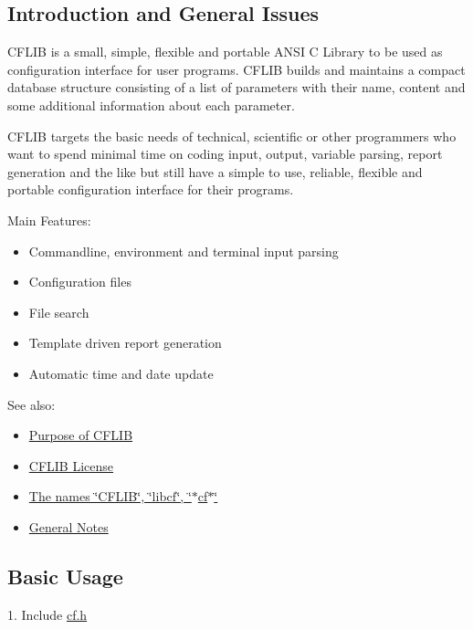\hypertarget{index_intro}{}\subsection{Introduction and General Issues}\label{index_intro}
CFLIB is a small, simple, flexible and portable ANSI C Library to be used as configuration interface for user programs. CFLIB builds and maintains a compact database structure consisting of a list of parameters with their name, content and some additional information about each parameter.

CFLIB targets the basic needs of technical, scientific or other programmers who want to spend minimal time on coding input, output, variable parsing, report generation and the like but still have a simple to use, reliable, flexible and portable configuration interface for their programs.

\begin{Desc}
\item[Main Features:]\end{Desc}
\begin{itemize}
\item Commandline, environment and terminal input parsing\item Configuration files\item File search\item Template driven report generation\item Automatic time and date update\end{itemize}


\begin{Desc}
\item[See also:]\begin{itemize}
\item \hyperlink{purpose}{Purpose of CFLIB}\item \hyperlink{license}{CFLIB License}\item \hyperlink{properties_names}{The names \char`\"{}CFLIB\char`\"{}, \char`\"{}libcf\char`\"{}, \char`\"{}$\ast$cf$\ast$\char`\"{}}\item \hyperlink{properties}{General Notes}\end{itemize}
\end{Desc}
\hypertarget{index_basic_usage}{}\subsection{Basic Usage}\label{index_basic_usage}
1. Include \hyperlink{cf_8h}{cf.h}

